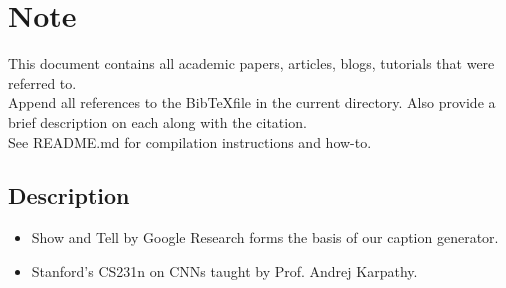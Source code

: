 \documentclass{article}
\begin{document}
\section*{Note}

This document contains all academic papers, articles, blogs, tutorials that were referred to.\\

Append all references to the BibTeX\@ file in the current directory. Also provide a brief description on each along with the citation.\\

See README.md for compilation instructions and how-to.

\subsection*{Description}

\begin{itemize}
	\item Show and Tell\cite{vinyals} by Google Research forms the basis of our caption generator.
	\item Stanford's CS231n \cite{cs231n} on CNNs taught by Prof. Andrej Karpathy.
\end{itemize}


 

\end{document}
